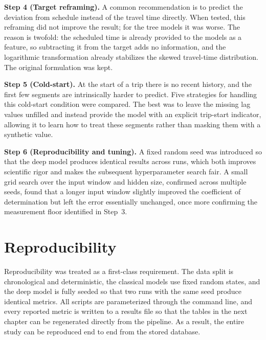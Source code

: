 \textbf{Step 4 (Target reframing).} A common recommendation is to predict the deviation from schedule instead of the travel time directly. When tested, this reframing did not improve the result; for the tree models it was worse. The reason is twofold: the scheduled time is already provided to the models as a feature, so subtracting it from the target adds no information, and the logarithmic transformation already stabilizes the skewed travel-time distribution. The original formulation was kept.

\textbf{Step 5 (Cold-start).} At the start of a trip there is no recent history, and the first few segments are intrinsically harder to predict. Five strategies for handling this cold-start condition were compared. The best was to leave the missing lag values unfilled and instead provide the model with an explicit trip-start indicator, allowing it to learn how to treat these segments rather than masking them with a synthetic value.

\textbf{Step 6 (Reproducibility and tuning).} A fixed random seed was introduced so that the deep model produces identical results across runs, which both improves scientific rigor and makes the subsequent hyperparameter search fair. A small grid search over the input window and hidden size, confirmed across multiple seeds, found that a longer input window slightly improved the coefficient of determination but left the error essentially unchanged, once more confirming the measurement floor identified in Step~3.

\section{Reproducibility}

Reproducibility was treated as a first-class requirement. The data split is chronological and deterministic, the classical models use fixed random states, and the deep model is fully seeded so that two runs with the same seed produce identical metrics. All scripts are parameterized through the command line, and every reported metric is written to a results file so that the tables in the next chapter can be regenerated directly from the pipeline. As a result, the entire study can be reproduced end to end from the stored database.
